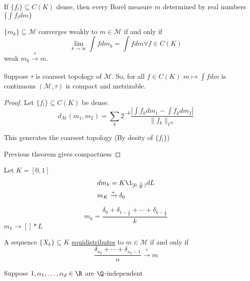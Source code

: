 \begin{remark}
	If $\{ f_l \} \subseteq C(K)$ dense, then every Borel measure $m$ determined by real numbers 
	$\{ \int f_l dm\}$
\end{remark}

\begin{definition}
	$\{m_k \} \subseteq \mathcal{M}$ converges weakly to $m \in \mathcal{M}$ if and only if 
	\[
		\lim_{k \to \infty} \int f dm_k = \int f dm \forall f \in C(K)
	\] 
	weak $m_k \xrightarrow[]{*} m$.
\end{definition}

\begin{theorem}
	Suppose $\tau$ is coarsest topology of $\mathcal{M}$. So, for all $f \in C(K)$  $m \mapsto \int f dm$ is continuous
	 $(\mathcal{M}, \tau)$ is compact and metrizable.
\end{theorem}
\begin{proof}
	Let $\{f_l\} \subseteq C(K)$ be dense.
	\[
		d_{\mathcal{M}} (m_1, m_2) = \sum_{k} 2^{-k} \frac{| \int f_k dm_1 - \int f_k dm_2 |}{\| f_k \|_{C^0}}
	\] 

\begin{exercise}
This generates the coarsest topology (By desity of $\{f_l\}$)
\end{exercise}

Previous theorem gives compactness
\end{proof}

\begin{example}
	Let $K = [0,1]$ 
	\begin{align*}
		&dm_{k} = K \1_{[0,\frac{1}{K})} dL \\
		&m_K \xrightarrow[]{*} \delta_0
	\end{align*} 
\end{example}

\begin{example}
	\[
		m_k = \frac{\delta_0 + \delta_{1 - \frac{1}{k}} + \cdots + \delta_{k - \frac{1}{k}}}{k}
	\] 
	$m_k \rightarrow[]{*} L$
\end{example}

\begin{definition}
	A sequence $\{X_k\} \subseteq K$ \underline{equidistributes} to $m \in \mathcal{M}$ if and only if
	 \[
		 \frac{\delta_{x_0} + \cdots + \delta_{x_{n} - 1}}{n} \xrightarrow[]{*} m
	\] 
\end{definition}

\begin{example}
	Suppose $1, \alpha_1, \ldots , \alpha_d \in \R$ are $\Q$-independent
\end{example}

